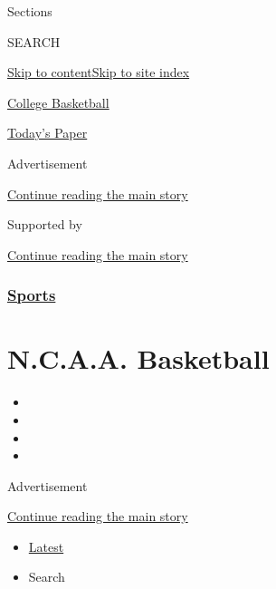 Sections

SEARCH

\protect\hyperlink{site-content}{Skip to
content}\protect\hyperlink{site-index}{Skip to site index}

\href{https://www.nytimes.com/section/sports/ncaabasketball}{College
Basketball}

\href{https://myaccount.nytimes.com/auth/login?response_type=cookie\&client_id=vi}{}

\href{https://www.nytimes.com/section/todayspaper}{Today's Paper}

Advertisement

\protect\hyperlink{after-top}{Continue reading the main story}

Supported by

\protect\hyperlink{after-sponsor}{Continue reading the main story}

\hypertarget{sports}{%
\subsubsection{\texorpdfstring{\href{/section/sports}{Sports}}{Sports}}\label{sports}}

\hypertarget{ncaa-basketball}{%
\section{N.C.A.A. Basketball}\label{ncaa-basketball}}

\begin{itemize}
\item
\item
\item
\item
\end{itemize}

Advertisement

\protect\hyperlink{after-subheader}{Continue reading the main story}

\begin{itemize}
\tightlist
\item
  \protect\hyperlink{stream-panel}{Latest}
\item
  Search
\end{itemize}

